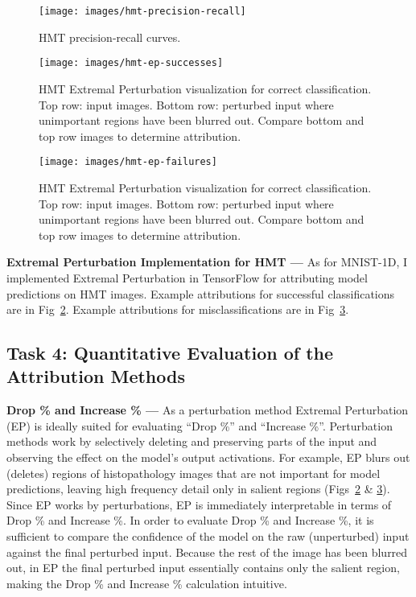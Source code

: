 \documentclass{article}
\newcommand{\myparagraph}[1]{\noindent\textbf{#1 ---}}
\begin{document}
\begin{figure}[t]
	\texttt{[image: images/hmt-precision-recall]}
	\caption{\label{fig:hmt-precision-recall}HMT precision-recall curves.}
\end{figure}

\begin{figure}[t]
	\texttt{[image: images/hmt-ep-successes]}
	\caption{\label{fig:hmt-ep-successes}HMT Extremal Perturbation visualization for correct classification.
		Top row: input images.
		Bottom row: perturbed input where unimportant regions have been blurred out.
		Compare bottom and top row images to determine attribution.}
\end{figure}


\begin{figure}[t]
	\texttt{[image: images/hmt-ep-failures]}
	\caption{\label{fig:hmt-ep-failures}HMT Extremal Perturbation visualization for correct classification.
		Top row: input images.
		Bottom row: perturbed input where unimportant regions have been blurred out.
		Compare bottom and top row images to determine attribution.}
\end{figure}

\myparagraph{Extremal Perturbation Implementation for HMT} As for MNIST-1D, I implemented Extremal Perturbation in TensorFlow for attributing model predictions on HMT images.
Example attributions for successful classifications are in Fig~\ref{fig:hmt-ep-successes}.
Example attributions for misclassifications are in Fig~\ref{fig:hmt-ep-failures}.


\subsection{Task 4: Quantitative Evaluation of the Attribution Methods}


\myparagraph{Drop \% and Increase \%} As a perturbation method Extremal Perturbation (EP) is ideally suited for evaluating ``Drop \%'' and ``Increase \%''.
Perturbation methods work by selectively deleting and preserving parts of the input and observing the effect on the model's output activations.
For example, EP blurs out (deletes) regions of histopathology images that are not important for model predictions, leaving high frequency detail only in salient regions (Figs~\ref{fig:hmt-ep-successes} \& \ref{fig:hmt-ep-failures}).
Since EP works by perturbations, EP is immediately interpretable in terms of Drop \% and Increase \%.
In order to evaluate Drop \% and Increase \%, it is sufficient to compare the confidence of the model on the raw (unperturbed) input against the final perturbed input.
Because the rest of the image has been blurred out, in EP the final perturbed input essentially contains only the salient region, making the Drop \% and Increase \% calculation intuitive.
\end{document}
